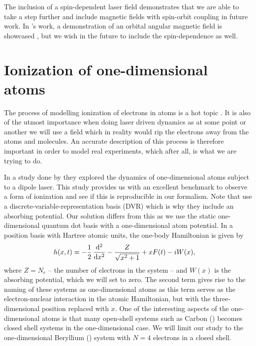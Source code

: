         The inclusion of a spin-dependent laser field demonstrates that we are
        able to take a step further and include magnetic fields with spin-orbit
        coupling in future work.
        In \citeauthor{greg-winther}'s work, a demonstration of an orbital
        angular magnetic field is showcased \cite{greg-winther}, but we wish in the future to
        include the spin-dependence as well.

    \section{Ionization of one-dimensional atoms}
        The process of modelling ionization of electrons in atoms is a hot
        topic \cite{kosloff1986363, miyagi_and_madsen, takeshi, sawada,
        Sato_2014}.
        It is also of the utmost importance when doing laser driven dynamics as
        at some point or another we will use a field which in reality would rip
        the electrons away from the atoms and molecules.
        An accurate description of this process is therefore important in order
        to model real experiments, which after all, is what we are trying to
        do.

        In a study done by \citeauthor{miyagi_and_madsen}
        \cite{miyagi_and_madsen} they explored the dynamics of one-dimensional
        atoms subject to a dipole laser.
        This study provides us with an excellent benchmark to observe a form
        of ionization and see if this is reproducible in our formalism.
        Note that \citeauthor{miyagi_and_madsen} \cite{miyagi_and_madsen} use a
        discrete-variable-representation basis (DVR) \cite{miyagi_and_madsen,
        takeshi} which is why they include an absorbing potential.
        Our solution differs from this as we use the static one-dimensional
        quantum dot basis with a one-dimensional atom potential.
        In a position basis with Hartree atomic units, the one-body
        Hamiltonian is given by \cite{miyagi_and_madsen}
        \begin{align}
            \oneten(x, t)
            &= -\half \dod[2]{}{x}
            - \frac{Z}{\sqrt{x^2 + 1}}
            + xF(t)
            - iW(x),
        \end{align}
        where $Z = N_e$ -- the number of electrons in the system -- and $W(x)$
        is the absorbing potential, which we will set to zero.
        The second term gives rise to the naming of these systems as
        one-dimensional atoms as this term serves as the electron-nuclear
        interaction in the atomic Hamiltonian, but with the three-dimensional
        position replaced with $x$.
        One of the interesting aspects of the one-dimensional atoms is that many
        open-shell systems such as Carbon () becomes closed shell systems
        in the one-dimensional case.
        We will limit our study to the one-dimensional Beryllium ()
        system with $N = 4$ electrons in a closed shell.

